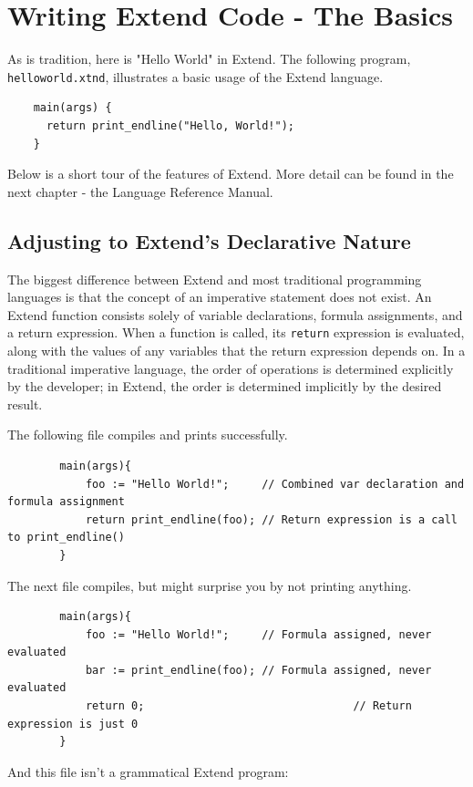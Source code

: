 \section{Writing Extend Code - The Basics}
As is tradition, here is "Hello World" in Extend. The following program, \texttt{helloworld.xtnd}, illustrates a basic usage of the Extend language.

\begin{lstlisting}
	main(args) {
	  return print_endline("Hello, World!");
	}
\end{lstlisting}

\medskip \noindent
Below is a short tour of the features of Extend. More detail can be found in the next chapter - the Language Reference Manual.

	\subsection{Adjusting to Extend's Declarative Nature}
	The biggest difference between Extend and most traditional programming languages is that the concept of an imperative statement does not exist. An Extend function consists solely of variable declarations, formula assignments, and a return expression. When a function is called, its \texttt{return} expression is evaluated, along with the values of any variables that the return expression depends on. In a traditional imperative language, the order of operations is determined explicitly by the developer; in Extend, the order is determined implicitly by the desired result.

	\medskip \noindent The following file compiles and prints successfully.

	\begin{lstlisting}
		main(args){
			foo := "Hello World!";     // Combined var declaration and formula assignment
			return print_endline(foo); // Return expression is a call to print_endline()
		}
	\end{lstlisting}

	\medskip \noindent The next file compiles, but might surprise you by not printing anything.

	\begin{lstlisting}
		main(args){
			foo := "Hello World!";     // Formula assigned, never evaluated
			bar := print_endline(foo); // Formula assigned, never evaluated
			return 0; 								 // Return expression is just 0
		}
	\end{lstlisting}
	\medskip \noindent And this file isn't a grammatical Extend program:

